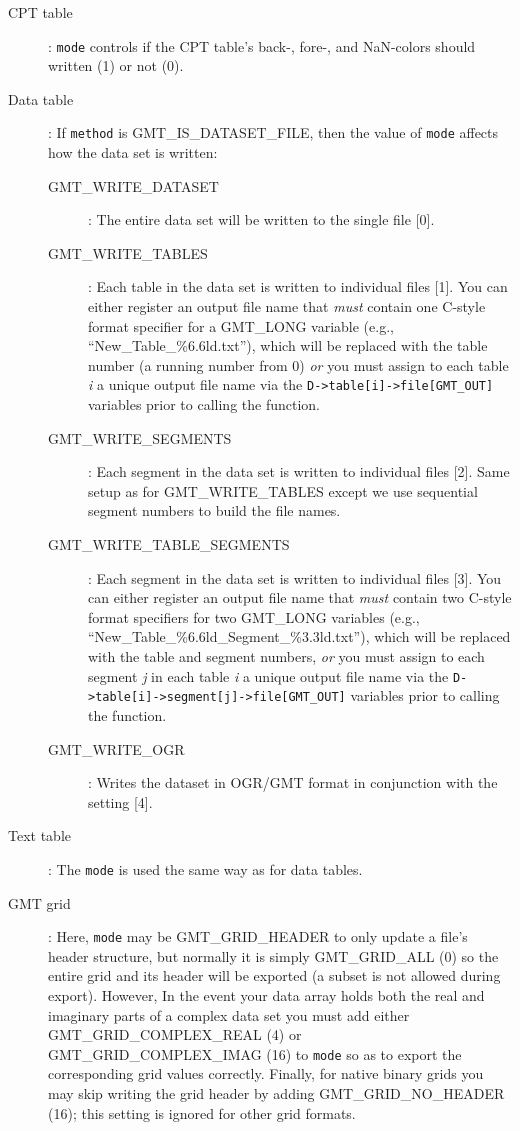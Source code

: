 \documentclass{report}
\begin{document}
\begin{description}
\item [CPT table]: \texttt{mode} controls if the CPT table's back-, fore-, and NaN-colors
should written (1) or not (0).
\item [Data table]: If \texttt{method} is GMT\_IS\_DATASET\_FILE, then the value of
\texttt{mode} affects how the data set is written:
\begin{description}
\item [GMT\_WRITE\_DATASET]: The entire data set will be written to the single file [0].
\item [GMT\_WRITE\_TABLES]: Each table in the data set is written to individual files [1].
You can either register an output file name that \emph{must} contain one C-style
format specifier for a GMT\_LONG variable (e.g., ``New\_Table\_\%6.6ld.txt''), which will be
replaced with the table number (a running number from 0) \emph{or} you must assign
to each table \emph{i} a unique output file name via the \texttt{D->table[i]->file[GMT\_OUT]}
variables prior to calling the function.
\item [GMT\_WRITE\_SEGMENTS]: Each segment in the data set is written to individual files [2].
Same setup as for GMT\_WRITE\_TABLES except we use sequential segment numbers to build the file names.
\item [GMT\_WRITE\_TABLE\_SEGMENTS]: Each segment in the data set is written to individual files [3].
You can either register an output file name that \emph{must} contain two C-style
format specifiers for two GMT\_LONG variables (e.g., ``New\_Table\_\%6.6ld\_Segment\_\%3.3ld.txt''),
which will be replaced with the table and segment numbers, \emph{or}
you must assign to each segment \emph{j} in each table \emph{i} a unique output file name
via the \texttt{D->table[i]->segment[j]->file[GMT\_OUT]} variables prior to calling the function.
\item [GMT\_WRITE\_OGR]: Writes the dataset in OGR/GMT format in conjunction with the  setting [4].
\end{description}
\item [Text table]: The \texttt{mode} is used the same way as for data tables.
\item [GMT grid]: Here, \texttt{mode} may be GMT\_GRID\_HEADER to only update a file's header
structure, but normally it is simply GMT\_GRID\_ALL (0) so the entire
grid and its header will be exported (a subset is not allowed during export).
However, In the event your data array holds both the real and imaginary parts of a
complex data set you must add either GMT\_GRID\_COMPLEX\_REAL (4) or GMT\_GRID\_COMPLEX\_IMAG (16) to \texttt{mode}
so as to export the corresponding grid values correctly.  Finally, for native binary grids you may skip writing
the grid header by adding GMT\_GRID\_NO\_HEADER (16); this setting is ignored for other grid formats.
\end{description}
\end{document}
